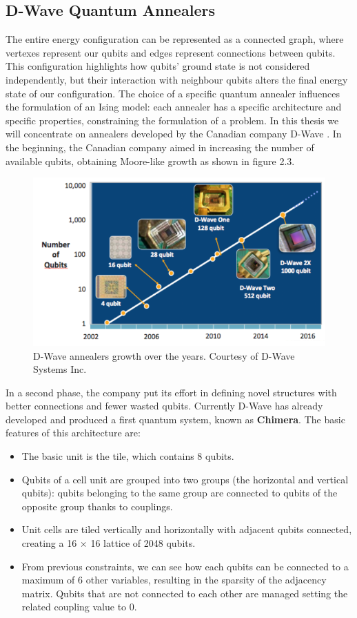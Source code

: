 \subsection{D-Wave Quantum Annealers}

The entire energy configuration can be represented as a connected graph, where vertexes represent our qubits and edges represent connections between qubits. This configuration highlights how qubits' ground state is not considered independently, but their interaction with neighbour qubits alters the final energy state of our configuration. The choice of a specific quantum annealer influences the formulation of an Ising model: each annealer has a specific architecture and specific properties, constraining the formulation of a problem. In this thesis we will concentrate on annealers developed by the Canadian company D-Wave \cite{Dwave}. In the beginning, the Canadian company aimed in increasing the number of available qubits, obtaining Moore-like growth as shown in figure 2.3. 
\begin{figure}[t]
	\begin{center}
	\includegraphics{images/DwaveMoore.PNG}
	\caption{D-Wave annealers growth over the years. Courtesy of D-Wave Systems Inc.}
	\end{center}
\end{figure}
In a second phase, the company put its effort in defining novel structures with better connections and fewer wasted qubits. Currently D-Wave has already developed and produced a first quantum system, known as \textbf{Chimera}. The basic features of this architecture are:

\begin{itemize}
    \item The basic unit is the tile, which contains 8 qubits.
    \item Qubits of a cell unit are grouped into two groups (the horizontal and vertical qubits): qubits belonging to the same group are connected to qubits of the opposite group thanks to couplings.
    \item Unit cells are tiled vertically and horizontally with adjacent qubits connected, creating a 16 $\times$ 16 lattice of 2048 qubits.
    \item From previous constraints, we can see how each qubits can be connected to a maximum of 6 other variables, resulting in the sparsity of the adjacency matrix. Qubits that are not connected to each other are managed setting the related coupling value to 0.
\end{itemize}

